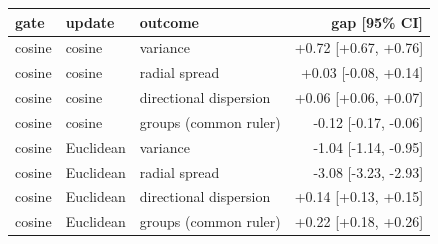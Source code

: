 \begin{tabular}{lllr}
\toprule
gate & update & outcome & gap [95\% CI] \\
\midrule
cosine & cosine & variance & +0.72 [+0.67, +0.76] \\
cosine & cosine & radial spread & +0.03 [-0.08, +0.14] \\
cosine & cosine & directional dispersion & +0.06 [+0.06, +0.07] \\
cosine & cosine & groups (common ruler) & -0.12 [-0.17, -0.06] \\
cosine & Euclidean & variance & -1.04 [-1.14, -0.95] \\
cosine & Euclidean & radial spread & -3.08 [-3.23, -2.93] \\
cosine & Euclidean & directional dispersion & +0.14 [+0.13, +0.15] \\
cosine & Euclidean & groups (common ruler) & +0.22 [+0.18, +0.26] \\
\bottomrule
\end{tabular}
